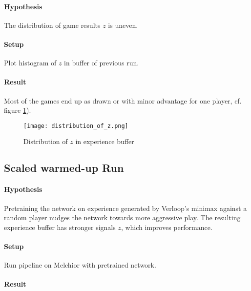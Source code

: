 \paragraph{Hypothesis} The distribution of game results $z$ is uneven.
\paragraph{Setup} Plot histogram of $z$ in buffer of previous run.
\paragraph{Result} Most of the games end up as drawn or with minor advantage for one player, cf. figure \ref{distribution_of_rewards}).

\begin{figure}
    \centering
    \texttt{[image: distribution\_of\_z.png]}
    \caption{Distribution of $z$ in experience buffer}
    \label{distribution_of_rewards}
\end{figure}

\subsection{Scaled warmed-up Run}
\paragraph{Hypothesis} Pretraining the network on experience generated by Verloop's minimax against a random player nudges the network towards more aggressive play. The resulting experience buffer has stronger signals $z$, which improves performance.
\paragraph{Setup} Run pipeline on Melchior with pretrained network.
\paragraph{Result}
\begin{figure}[!h]
    \centering
    \hfill
    \caption{}
    \label{performance_remote_warmed_up}
\end{figure}

